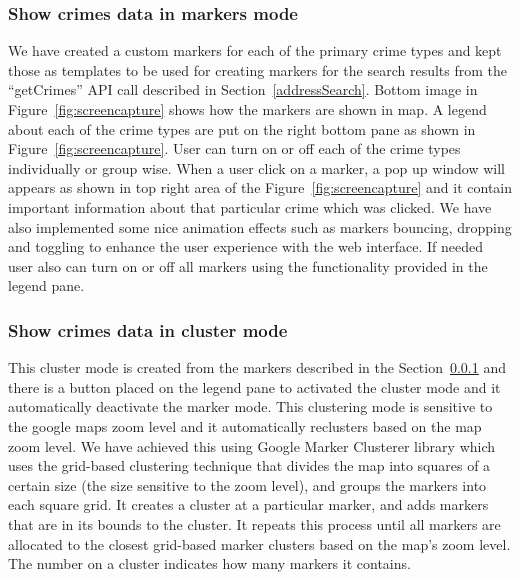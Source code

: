 \subsubsection{Show crimes data in markers mode}\label{markerMode}
We have created a custom markers for each of the primary crime types
and kept those as templates to be used for creating markers for the
search results from the ``getCrimes'' API call described in
Section~\ref{addressSearch}. Bottom image in
Figure~\ref{fig:screencapture} shows how the markers are shown in
map. A legend about each of the crime types are put on the right
bottom pane as shown in Figure~\ref{fig:screencapture}. User can turn
on or off each of the crime types individually or group wise. When a
user click on a marker, a pop up window will appears as shown in top
right area of the Figure~\ref{fig:screencapture} and it contain
important information about that particular crime which was
clicked. We have also implemented some nice animation effects such as
markers bouncing, dropping and toggling to enhance the user experience
with the web interface. If needed user also can turn on or off all
markers using the functionality provided in the legend pane.

\subsubsection{Show crimes data in cluster mode}\label{clusterMode}
This cluster mode is created from the markers described in the
Section~\ref{markerMode} and there is a button placed on the legend
pane to activated the cluster mode and it automatically deactivate the
marker mode. This clustering mode is sensitive to the google maps zoom
level and it automatically reclusters based on the map zoom level. We
have achieved this using Google Marker Clusterer library which uses
the grid-based clustering technique that divides the map into squares
of a certain size (the size sensitive to the zoom level), and groups
the markers into each square grid. It creates a cluster at a
particular marker, and adds markers that are in its bounds to the
cluster. It repeats this process until all markers are allocated to
the closest grid-based marker clusters based on the map's zoom
level. The number on a cluster indicates how many markers it contains.

